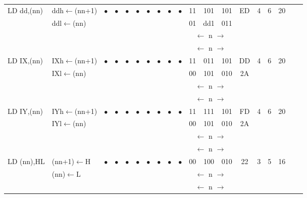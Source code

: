 \documentclass[oneside,a4paper]{book}
\begin{document}
{\begin{tabular}{llc@{ }c@{ }c@{ }c@{ }c@{ }c@{ }c@{ }cc@{ }c@{ }cccccll}
LD dd,(nn) & ddh$\leftarrow$(nn+1) &
	$\bullet$ & $\bullet$ & $\bullet$ & $\bullet$ & $\bullet$ & $\bullet$ & $\bullet$ & $\bullet$ & 11 & 101 & 101 
	& ED & 4 & 6 & 20 & & \\ 
           & ddl$\leftarrow$(nn) & \multicolumn{8}{c}{} & 01 & dd1 & 011 & \multicolumn{4}{c}{} & & \\
\multicolumn{10}{c}{} & \multicolumn{3}{c}{$\leftarrow$ n $\rightarrow$} & \multicolumn{4}{c}{} & & \\
\multicolumn{10}{c}{} & \multicolumn{3}{c}{$\leftarrow$ n $\rightarrow$} & \multicolumn{4}{c}{} & & \\

LD IX,(nn) & IXh$\leftarrow$(nn+1) &
	$\bullet$ & $\bullet$ & $\bullet$ & $\bullet$ & $\bullet$ & $\bullet$ & $\bullet$ & $\bullet$ & 11 & 011 & 101 
	& DD & 4 & 6 & 20 & & \\ 
           & IXl$\leftarrow$(nn) & \multicolumn{8}{c}{} & 00 & 101 & 010 & 2A & \multicolumn{3}{c}{} & & \\
\multicolumn{10}{c}{} & \multicolumn{3}{c}{$\leftarrow$ n $\rightarrow$} & \multicolumn{4}{c}{} & & \\
\multicolumn{10}{c}{} & \multicolumn{3}{c}{$\leftarrow$ n $\rightarrow$} & \multicolumn{4}{c}{} & & \\

LD IY,(nn) & IYh$\leftarrow$(nn+1) &
	$\bullet$ & $\bullet$ & $\bullet$ & $\bullet$ & $\bullet$ & $\bullet$ & $\bullet$ & $\bullet$ & 11 & 111 & 101 
	& FD & 4 & 6 & 20 & & \\ 
           & IYl$\leftarrow$(nn) & \multicolumn{8}{c}{} & 00 & 101 & 010 & 2A & \multicolumn{3}{c}{} & & \\
\multicolumn{10}{c}{} & \multicolumn{3}{c}{$\leftarrow$ n $\rightarrow$} & \multicolumn{4}{c}{} & & \\
\multicolumn{10}{c}{} & \multicolumn{3}{c}{$\leftarrow$ n $\rightarrow$} & \multicolumn{4}{c}{} & & \\

LD (nn),HL & (nn+1)$\leftarrow$H &
	$\bullet$ & $\bullet$ & $\bullet$ & $\bullet$ & $\bullet$ & $\bullet$ & $\bullet$ & $\bullet$ & 00 & 100 & 010
	& 22 & 3 & 5 & 16 & & \\ 
           & (nn)$\leftarrow$L & \multicolumn{8}{c}{} & \multicolumn{3}{c}{$\leftarrow$ n $\rightarrow$} & \multicolumn{4}{c}{} & & \\
\multicolumn{10}{c}{} & \multicolumn{3}{c}{$\leftarrow$ n $\rightarrow$} & \multicolumn{4}{c}{} & & \\


\end{tabular}}
\end{document}
